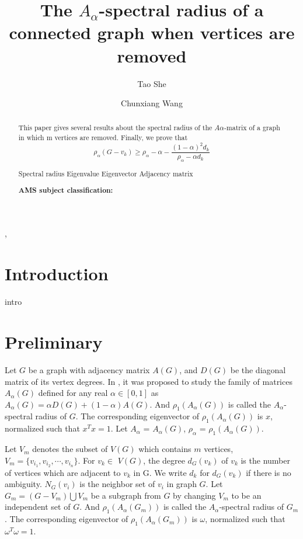 \documentclass[amsthm]{elsart}
\begin{document}
\begin{frontmatter}
\title{The $A_{\alpha}$-spectral radius of a connected graph when vertices  are removed }

\journal{~~}

\author[CW]{Tao She},
\author[CW]{Chunxiang Wang}



\address[CW]{ School of Mathematics and Statistics, Central China Normal University, Wuhan,  P.R. China}







\begin{abstract}
This paper gives several results about the spectral radius of the $A \alpha$-matrix of a
graph in which m vertices are removed. Finally, we prove that
\begin{equation*}
\rho _\alpha (G - v_k)
  \geqslant \rho _\alpha - \alpha - \frac{(1 - \alpha)^2 d_k}{\rho _\alpha - \alpha d_k}
\end{equation*}

\vskip 2mm 
Spectral radius
Eigenvalue
Eigenvector
Adjacency matrix

{\bf AMS subject classification:}


\end{abstract}


\end{frontmatter}

\section{Introduction}
intro
\section{Preliminary}
\qquad Let $G$ be a graph with adjacency matrix $A(G)$, and $D(G)$ be the diagonal matrix of its vertex degrees. In  \cite{2016Merging}, it was proposed to study the family of matrices $A_\alpha(G)$ defined for any real $\alpha\in[0,1]$ as
$A_\alpha(G) = \alpha D(G) + (1 - \alpha)A(G)$.
And $\rho_1(A_\alpha(G))$ is called the $A_\alpha$-spectral radius of $G$. The corresponding eigenvector of $\rho_1(A_\alpha(G))$ is $x$, normalized such that $x^{T} x = 1$.
Let $A_\alpha$ = $A_\alpha(G)$, $\rho_\alpha$ = $\rho_1(A_\alpha(G))$.

\qquad Let $V_m$ denotes the subset of $V(G)$ which contains $m$ vertices, $V_m=\{v_{i_1}, v_{i_2}, \cdots, v_{i_n}\}$. For $v_k \in$ $V(G)$, the degree $d_G(v_k)$ of $v_k$ is the number of vertices which are adjacent to $v_k$ in G. We write $d_k$ for $d_G(v_k)$ if there
is no ambiguity. $N_G(v_i)$ is the neighbor set of $v_i$ in graph $G$.
Let $G_m = (G - V_m) \bigcup V_m$ be a subgraph from $G$ by changing $V_m$ to be an independent set of $G$.
And $\rho_1(A_\alpha(G_m))$ is called the $A_\alpha$-spectral radius of $G_m$.
The corresponding eigenvector of $\rho_1(A_\alpha(G_m))$ is
$\omega$, normalized such that $\omega^{T} \omega = 1$.
\end{document}
